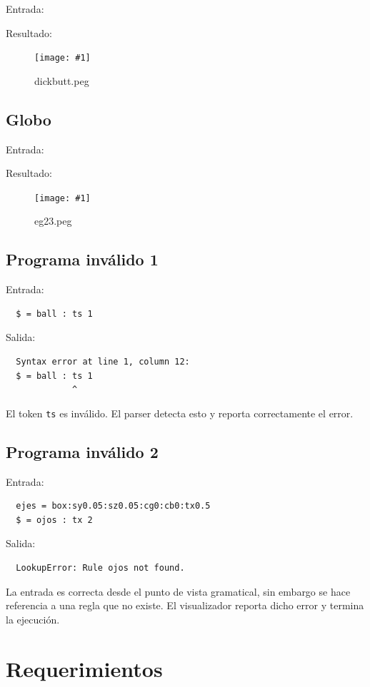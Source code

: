 \documentclass[a4paper, 10pt, twoside]{article}
\newcommand{\grafico}[3]{
  \begin{figure}[H]
  	\centering
    \texttt{[image: \#1]}
    \caption{#2}
    \label{#3}
  \end{figure}
}
\begin{document}
Entrada:



Resultado:

\grafico{dickbutt.png}{dickbutt.peg}{dickbutt}


\subsection{Globo}

Entrada:



Resultado:

\grafico{ejemplo23.png}{eg23.peg}{eg23}


\subsection{Programa inválido 1}

Entrada:

\begin{verbatim}
  $ = ball : ts 1
\end{verbatim}

Salida:

\begin{verbatim}
  Syntax error at line 1, column 12:
  $ = ball : ts 1
             ^
\end{verbatim}

El token \texttt{ts} es inválido. El parser detecta esto y reporta correctamente el error.


\subsection{Programa inválido 2}

Entrada:

\begin{verbatim}
  ejes = box:sy0.05:sz0.05:cg0:cb0:tx0.5
  $ = ojos : tx 2
\end{verbatim}

Salida:

\begin{verbatim}
  LookupError: Rule ojos not found.
\end{verbatim}

La entrada es correcta desde el punto de vista gramatical, sin embargo se hace referencia a una regla que no existe. El visualizador reporta dicho error y termina la ejecución.


\section{Requerimientos}
\end{document}
